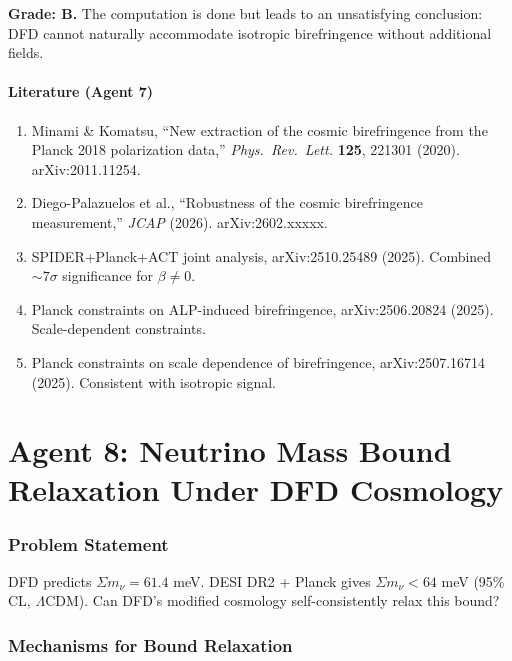 \documentclass[11pt,a4paper]{article}
\begin{document}
\textbf{Grade: B.} The computation is done but leads to an unsatisfying conclusion: DFD cannot naturally accommodate isotropic birefringence without additional fields.

\subsection{Literature (Agent 7)}

\begin{enumerate}
\item Minami \& Komatsu, ``New extraction of the cosmic birefringence from the Planck 2018 polarization data,'' \textit{Phys.\ Rev.\ Lett.} \textbf{125}, 221301 (2020). arXiv:2011.11254.
\item Diego-Palazuelos et al., ``Robustness of the cosmic birefringence measurement,'' \textit{JCAP} (2026). arXiv:2602.xxxxx.
\item SPIDER+Planck+ACT joint analysis, arXiv:2510.25489 (2025). Combined $\sim 7\sigma$ significance for $\beta \neq 0$.
\item Planck constraints on ALP-induced birefringence, arXiv:2506.20824 (2025). Scale-dependent constraints.
\item Planck constraints on scale dependence of birefringence, arXiv:2507.16714 (2025). Consistent with isotropic signal.
\end{enumerate}


\part{Agent 8: Neutrino Mass Bound Relaxation Under DFD Cosmology}
\label{part:neutrino}

\section{Problem Statement}

DFD predicts $\Sigma m_\nu = 61.4$ meV. DESI DR2 + Planck gives $\Sigma m_\nu < 64$ meV (95\% CL, $\Lambda$CDM). Can DFD's modified cosmology self-consistently relax this bound?

\section{Mechanisms for Bound Relaxation}
\end{document}
